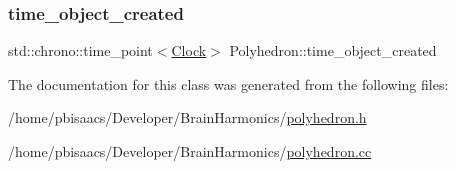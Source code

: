 \mbox{\label{classPolyhedron_a59ae1bf10fa368663a38f3fab34534ca}} 
\subsubsection{\texorpdfstring{time\+\_\+object\+\_\+created}{time\_object\_created}}
{\footnotesize\ttfamily std\+::chrono\+::time\+\_\+point$<$\mbox{\hyperlink{universe_8h_a0ef8d951d1ca5ab3cfaf7ab4c7a6fd80}{Clock}}$>$ Polyhedron\+::time\+\_\+object\+\_\+created\hspace{0.3cm}{\ttfamily [private]}}



The documentation for this class was generated from the following files\+:\begin{DoxyCompactItemize}
\item 
/home/pbisaacs/\+Developer/\+Brain\+Harmonics/\mbox{\hyperlink{polyhedron_8h}{polyhedron.\+h}}\item 
/home/pbisaacs/\+Developer/\+Brain\+Harmonics/\mbox{\hyperlink{polyhedron_8cc}{polyhedron.\+cc}}\end{DoxyCompactItemize}
